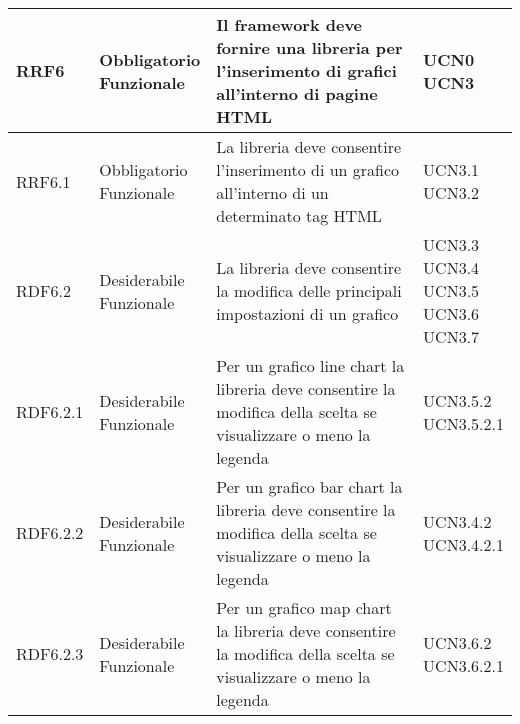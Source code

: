 \begin{longtabu}[c]{|X[0.7,l]|X[l]|X[2.5,l]|X[l]|}
                RRF6 & 
                \parbox[t]{4cm}{ Obbligatorio \\ Funzionale} & Il framework deve fornire una libreria per l'inserimento di grafici all'interno di pagine HTML & \parbox[t]{4cm}{UCN0 \\ UCN3 }  \\ 
                \hline
                
                RRF6.1 & 
                \parbox[t]{4cm}{ Obbligatorio \\ Funzionale} & La libreria deve consentire l'inserimento di un grafico all'interno di un determinato tag HTML & \parbox[t]{4cm}{UCN3.1 \\ UCN3.2 }  \\ 
                \hline
                
                RDF6.2 & 
                \parbox[t]{4cm}{ Desiderabile \\ Funzionale} & La libreria deve consentire la modifica delle principali impostazioni di un grafico & \parbox[t]{4cm}{UCN3.3 \\ UCN3.4 \\ UCN3.5 \\ UCN3.6 \\ UCN3.7 }  \\ 
                \hline
                
                RDF6.2.1 & 
                \parbox[t]{4cm}{ Desiderabile \\ Funzionale} & Per un grafico line chart la libreria deve consentire la modifica della scelta se visualizzare o meno la legenda & \parbox[t]{4cm}{UCN3.5.2 \\ UCN3.5.2.1 }  \\ 
                \hline
                
                RDF6.2.2 & 
                \parbox[t]{4cm}{ Desiderabile \\ Funzionale} & Per un grafico bar chart la libreria deve consentire la modifica della scelta se visualizzare o meno la legenda & \parbox[t]{4cm}{UCN3.4.2 \\ UCN3.4.2.1 }  \\ 
                \hline
                
                RDF6.2.3 & 
                \parbox[t]{4cm}{ Desiderabile \\ Funzionale} & Per un grafico map chart la libreria deve consentire la modifica della scelta se visualizzare o meno la legenda & \parbox[t]{4cm}{UCN3.6.2 \\ UCN3.6.2.1 }  \\ 
                \hline
                

\end{longtabu}
